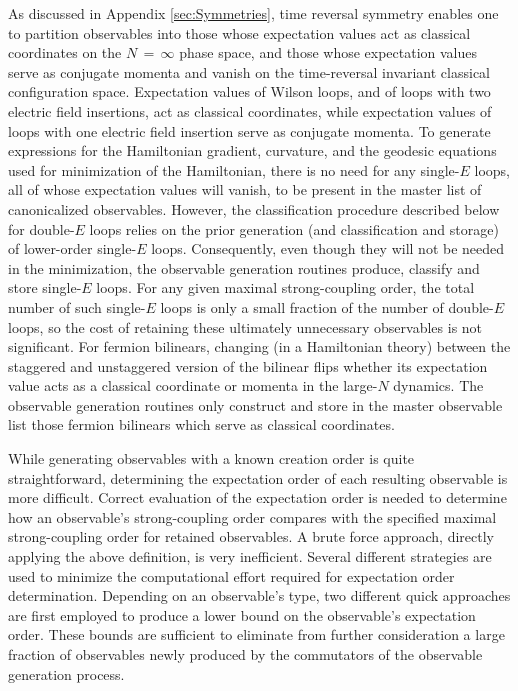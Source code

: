 \documentclass [12pt]{article}
\begin{document}
As discussed in Appendix \ref{sec:Symmetries},
time reversal symmetry enables one to partition observables into
those whose expectation values act as classical coordinates on the
$N\,{=}\,\infty$ phase space,
and those whose expectation values serve as conjugate momenta and
vanish on the time-reversal invariant classical configuration space.
Expectation values of Wilson loops, and of loops with two electric
field insertions, act as classical coordinates, while
expectation values of loops with one electric field insertion
serve as conjugate momenta.
To generate expressions for the Hamiltonian gradient,
curvature, and the geodesic equations used for minimization
of the Hamiltonian, there is no need for any single-$E$ loops,
all of whose expectation values will vanish, to be present
in the master list of canonicalized observables.
However, the classification procedure described below for double-$E$
loops relies on the prior generation (and classification and storage)
of lower-order single-$E$ loops.
Consequently, even though they will not be needed in the
minimization, the observable generation routines
produce, classify and store single-$E$ loops.
For any given maximal strong-coupling order, the total
number of such single-$E$ loops is only a small fraction of the
number of double-$E$ loops, so the cost of retaining these
ultimately unnecessary observables is not significant.
For fermion bilinears, changing (in a Hamiltonian theory)
between the staggered and unstaggered version of the bilinear flips
whether its expectation value acts
as a classical coordinate or momenta
in the large-$N$ dynamics.
The observable generation routines only construct and store
in the master observable list those fermion bilinears which
serve as classical coordinates.

While generating observables with a known creation order
is quite straightforward,
determining the expectation order of each resulting observable
is more difficult.
Correct evaluation of the expectation order is
needed to determine how an observable's strong-coupling order
compares with the specified maximal
strong-coupling order for retained observables.
A brute force approach, directly applying the above definition,
is very inefficient.
Several different strategies are used to minimize the computational effort
required for expectation order determination.
Depending on an observable's type, two different quick
approaches are first employed to produce a lower bound on the observable's
expectation order.
These bounds are sufficient to eliminate from further consideration
a large fraction of observables newly produced by the commutators
of the observable generation process.
\end{document}
